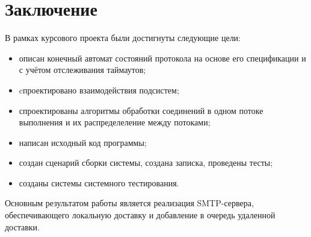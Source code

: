 \chapter{Заключение}

В рамках курсового проекта были достигнуты следующие цели:
\begin{itemize}
\item описан конечный автомат состояний протокола на основе его спецификации и с учётом отслеживания таймаутов;
\item cпроектировано взаимодействия подсистем;
\item спроектированы алгоритмы обработки соединений в одном потоке выполнения и их распределеление между потоками;
\item написан исходный код программы;
\item создан сценарий сборки системы, создана записка, проведены тесты;
\item созданы системы системного тестирования.
\end{itemize}

Основным результатом работы является реализация SMTP-сервера, обеспечивающего локальную доставку и добавление в очередь удаленной доставки.
